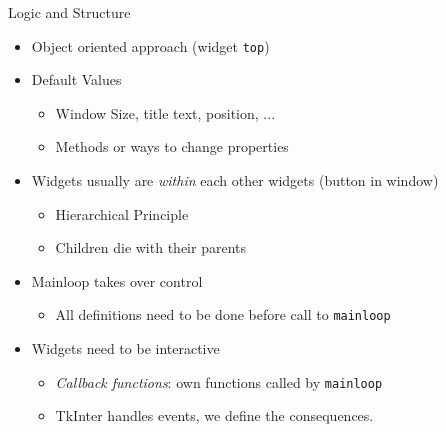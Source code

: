 \begin{frame}{Logic and Structure}
%
\begin{itemize}
\item Object oriented approach (widget \texttt{top})
\item Default Values
	\begin{itemize}
	\item Window Size, title text, position, ...
	\item[\Thus] Methods or ways to change properties
	\end{itemize}
\item Widgets usually are \emph{within} each other widgets (button in window)
	\begin{itemize}
	\item[\Thus] Hierarchical Principle
	\item[\Thus] Children die with their parents
	\end{itemize}
\item Mainloop takes over control
	\begin{itemize}
	\item[\Thus] All definitions need to be done before call to \texttt{mainloop}
	\end{itemize}
\item Widgets need to be interactive
	\begin{itemize}
	\item[\Thus] \emph{Callback functions}: own functions called by \texttt{mainloop}
	\item[\Thus] TkInter handles events, we define the consequences.
	\end{itemize}
\end{itemize}
%
\end{frame}


